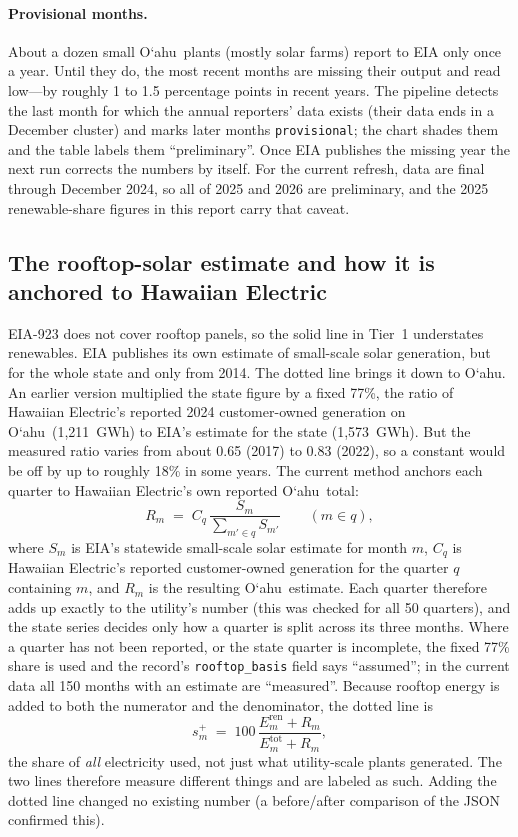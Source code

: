\documentclass[11pt,a4paper]{article}
\newcommand{\okina}{\textquoteleft}
\newcommand{\Oahu}{\texorpdfstring{O\okina ahu}{Oahu}}
\newcommand{\code}[1]{\nolinkurl{#1}}      %
\begin{document}
\paragraph{Provisional months.} About a dozen small \Oahu\ plants (mostly solar farms) report to EIA only once a
year. Until they do, the most recent months are missing their output and read low---by roughly 1 to 1.5
percentage points in recent years. The pipeline detects the last month for which the annual reporters' data
exists (their data ends in a December cluster) and marks later months \code{provisional}; the chart shades them and the
table labels them ``preliminary''. Once EIA publishes the missing year the next run corrects the numbers by
itself. For the current refresh, data are final through December 2024, so all of 2025 and 2026 are
preliminary, and the 2025 renewable-share figures in this report carry that caveat.

\subsection{The rooftop-solar estimate and how it is anchored to Hawaiian Electric}
EIA-923 does not cover rooftop panels, so the solid line in Tier~1 understates renewables. EIA publishes its own
estimate of small-scale solar generation, but for the whole state and only from 2014. The dotted line brings it
down to \Oahu. An earlier version multiplied the state figure by a fixed 77\%, the ratio of Hawaiian Electric's
reported 2024 customer-owned generation on \Oahu\ (1,211~GWh) to EIA's estimate for the state (1,573~GWh). But the
measured ratio varies from about 0.65 (2017) to 0.83 (2022), so a constant would be off by up to roughly 18\% in
some years. The current method anchors each quarter to Hawaiian Electric's own reported \Oahu\ total:
\begin{equation}
R_m \;=\; C_q\,\frac{S_m}{\sum_{m'\in q} S_{m'}}\qquad (m \in q),
\end{equation}
where $S_m$ is EIA's statewide small-scale solar estimate for month $m$, $C_q$ is Hawaiian Electric's reported
customer-owned generation for the quarter $q$ containing $m$, and $R_m$ is the resulting \Oahu\ estimate. Each
quarter therefore adds up exactly to the utility's number (this was checked for all 50 quarters), and the state
series decides only how a quarter is split across its three months. Where a quarter has not been reported, or
the state quarter is incomplete, the fixed 77\% share is used and the record's \code{rooftop_basis} field says
``assumed''; in the current data all 150 months with an estimate are ``measured''. Because rooftop energy is
added to both the numerator and the denominator, the dotted line is
\begin{equation}
s^{+}_m \;=\; 100\,\frac{E^{\text{ren}}_m + R_m}{E^{\text{tot}}_m + R_m},
\end{equation}
the share of \emph{all} electricity used, not just what utility-scale plants generated. The two lines
therefore measure different things and are labeled as such. Adding the dotted line changed no existing
number (a before/after comparison of the JSON confirmed this).
\end{document}
